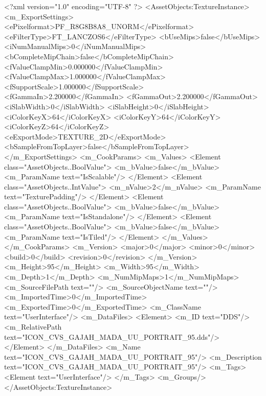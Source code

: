 <?xml version="1.0" encoding="UTF-8" ?>
<AssetObjects:TextureInstance>
    <m_ExportSettings>
        <ePixelformat>PF_R8G8B8A8_UNORM</ePixelformat>
        <eFilterType>FT_LANCZOS6</eFilterType>
        <bUseMips>false</bUseMips>
        <iNumManualMips>0</iNumManualMips>
        <bCompleteMipChain>false</bCompleteMipChain>
        <fValueClampMin>0.000000</fValueClampMin>
        <fValueClampMax>1.000000</fValueClampMax>
        <fSupportScale>1.000000</fSupportScale>
        <fGammaIn>2.200000</fGammaIn>
        <fGammaOut>2.200000</fGammaOut>
        <iSlabWidth>0</iSlabWidth>
        <iSlabHeight>0</iSlabHeight>
        <iColorKeyX>64</iColorKeyX>
        <iColorKeyY>64</iColorKeyY>
        <iColorKeyZ>64</iColorKeyZ>
        <eExportMode>TEXTURE_2D</eExportMode>
        <bSampleFromTopLayer>false</bSampleFromTopLayer>
    </m_ExportSettings>
    <m_CookParams>
        <m_Values>
            <Element class="AssetObjects..BoolValue">
                <m_bValue>false</m_bValue>
                <m_ParamName text="IsScalable"/>
            </Element>
            <Element class="AssetObjects..IntValue">
                <m_nValue>2</m_nValue>
                <m_ParamName text="TexturePadding"/>
            </Element>
            <Element class="AssetObjects..BoolValue">
                <m_bValue>false</m_bValue>
                <m_ParamName text="IsStandalone"/>
            </Element>
            <Element class="AssetObjects..BoolValue">
                <m_bValue>false</m_bValue>
                <m_ParamName text="IsTiled"/>
            </Element>
        </m_Values>
    </m_CookParams>
    <m_Version>
        <major>0</major>
        <minor>0</minor>
        <build>0</build>
        <revision>0</revision>
    </m_Version>
    <m_Height>95</m_Height>
    <m_Width>95</m_Width>
    <m_Depth>1</m_Depth>
    <m_NumMipMaps>1</m_NumMipMaps>
    <m_SourceFilePath text=""/>
    <m_SourceObjectName text=""/>
    <m_ImportedTime>0</m_ImportedTime>
    <m_ExportedTime>0</m_ExportedTime>
    <m_ClassName text="UserInterface"/>
    <m_DataFiles>
        <Element>
            <m_ID text="DDS"/>
            <m_RelativePath text="ICON_CVS_GAJAH_MADA_UU_PORTRAIT_95.dds"/>
        </Element>
    </m_DataFiles>
    <m_Name text="ICON_CVS_GAJAH_MADA_UU_PORTRAIT_95"/>
    <m_Description text="ICON_CVS_GAJAH_MADA_UU_PORTRAIT_95"/>
    <m_Tags>
        <Element text="UserInterface"/>
    </m_Tags>
    <m_Groups/>
</AssetObjects:TextureInstance>
